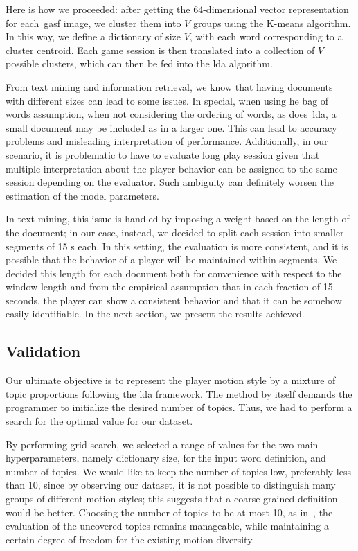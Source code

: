 Here is how we proceeded: after getting the 64-dimensional vector representation for each~\gls{gasf} image, we cluster them into $V$ groups using the K-means algorithm. In this way, we define a dictionary of size $V$, with each word corresponding to a cluster centroid. Each game session is then translated into a collection of $V$ possible clusters, which can then be fed into the \gls{lda} algorithm.

From text mining and information retrieval, we know that having documents with different sizes can lead to some issues. In special, when using he bag of words assumption, \ie when not considering the ordering of words, as does~\gls{lda}, a small document may be included as in a larger one. This can lead to accuracy problems and misleading interpretation of performance. Additionally, in our scenario, it is problematic to have to evaluate long play session given that multiple interpretation about the player behavior can be assigned to the same session depending on the evaluator. Such ambiguity can definitely worsen the estimation of the model parameters.

In text mining, this issue is handled by imposing a weight based on the length of the document; in our case, instead, we decided to split each session into smaller segments of 15 s each. In this setting, the evaluation is more consistent, and it is possible that the behavior of a player will be maintained within segments. We decided this length for each document both for convenience with respect to the window length and from the empirical assumption that in each fraction of 15 seconds, the player can show a consistent behavior and that it can be somehow easily identifiable. In the next section, we present the results achieved.

\subsection{Validation}

Our ultimate objective is to represent the player motion style by a mixture of topic proportions following the \gls{lda} framework. The method by itself demands the programmer to initialize the desired number of topics. Thus, we had to perform a search for the optimal value for our dataset.

By performing grid search, we selected a range of values for the two main hyperparameters, namely dictionary size, for the input word definition, and number of topics. We would like to keep the number of topics low, preferably less than 10, since by observing our dataset, it is not possible to distinguish many groups of different motion styles; this suggests that a coarse-grained definition would be better. Choosing the number of topics to be at most 10, as in~\cite{smith_mining_2016}, the evaluation of the uncovered topics remains manageable, while maintaining a certain degree of freedom for the existing motion diversity.

